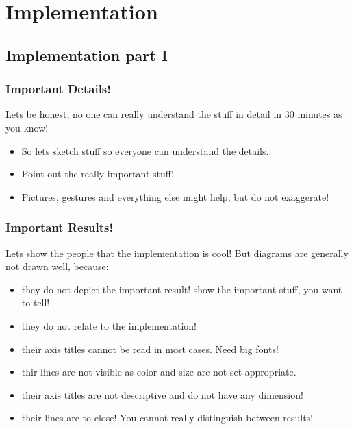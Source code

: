 \section{Implementation}


\subsection{Implementation part I}

\begin{frame}
\frametitle{Important Details!}
Lets be honest, no one can really understand the stuff in detail in 30 minutes as you know!
\begin{itemize}
\item So lets sketch stuff so everyone can understand the details.
\item Point out the really important stuff!
\item Pictures, gestures and everything else might help, but do not exaggerate!
\end{itemize}
\end{frame}


\begin{frame}
\frametitle{Important Results!}
Lets show the people that the implementation is cool! 
But diagrams are generally not drawn well, because:
\begin{itemize}
\item they do not depict the important result! show the important stuff, you want to tell!
\item they do not relate to the implementation!
\item their axis titles cannot be read in most cases. Need big fonts!
\item thir lines are not visible as color and size are not set appropriate.
\item their axis titles are not descriptive and do not have any dimension!
\item their lines are to close! You cannot really distinguish between results!
\end{itemize}
\end{frame}


